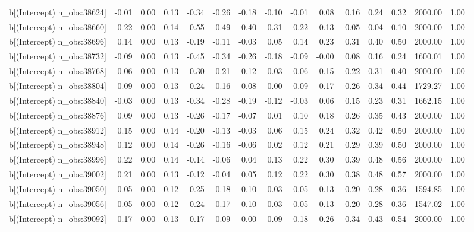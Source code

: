 \begin{table}[ht]
\begin{tabular}{rrrrrrrrrrrrrrr}
  b[(Intercept) n\_obs:38624] & -0.01 & 0.00 & 0.13 & -0.34 & -0.26 & -0.18 & -0.10 & -0.01 & 0.08 & 0.16 & 0.24 & 0.32 & 2000.00 & 1.00 \\ 
  b[(Intercept) n\_obs:38660] & -0.22 & 0.00 & 0.14 & -0.55 & -0.49 & -0.40 & -0.31 & -0.22 & -0.13 & -0.05 & 0.04 & 0.10 & 2000.00 & 1.00 \\ 
  b[(Intercept) n\_obs:38696] & 0.14 & 0.00 & 0.13 & -0.19 & -0.11 & -0.03 & 0.05 & 0.14 & 0.23 & 0.31 & 0.40 & 0.50 & 2000.00 & 1.00 \\ 
  b[(Intercept) n\_obs:38732] & -0.09 & 0.00 & 0.13 & -0.45 & -0.34 & -0.26 & -0.18 & -0.09 & -0.00 & 0.08 & 0.16 & 0.24 & 1600.01 & 1.00 \\ 
  b[(Intercept) n\_obs:38768] & 0.06 & 0.00 & 0.13 & -0.30 & -0.21 & -0.12 & -0.03 & 0.06 & 0.15 & 0.22 & 0.31 & 0.40 & 2000.00 & 1.00 \\ 
  b[(Intercept) n\_obs:38804] & 0.09 & 0.00 & 0.13 & -0.24 & -0.16 & -0.08 & -0.00 & 0.09 & 0.17 & 0.26 & 0.34 & 0.44 & 1729.27 & 1.00 \\ 
  b[(Intercept) n\_obs:38840] & -0.03 & 0.00 & 0.13 & -0.34 & -0.28 & -0.19 & -0.12 & -0.03 & 0.06 & 0.15 & 0.23 & 0.31 & 1662.15 & 1.00 \\ 
  b[(Intercept) n\_obs:38876] & 0.09 & 0.00 & 0.13 & -0.26 & -0.17 & -0.07 & 0.01 & 0.10 & 0.18 & 0.26 & 0.35 & 0.43 & 2000.00 & 1.00 \\ 
  b[(Intercept) n\_obs:38912] & 0.15 & 0.00 & 0.14 & -0.20 & -0.13 & -0.03 & 0.06 & 0.15 & 0.24 & 0.32 & 0.42 & 0.50 & 2000.00 & 1.00 \\ 
  b[(Intercept) n\_obs:38948] & 0.12 & 0.00 & 0.14 & -0.26 & -0.16 & -0.06 & 0.02 & 0.12 & 0.21 & 0.29 & 0.39 & 0.50 & 2000.00 & 1.00 \\ 
  b[(Intercept) n\_obs:38996] & 0.22 & 0.00 & 0.14 & -0.14 & -0.06 & 0.04 & 0.13 & 0.22 & 0.30 & 0.39 & 0.48 & 0.56 & 2000.00 & 1.00 \\ 
  b[(Intercept) n\_obs:39002] & 0.21 & 0.00 & 0.13 & -0.12 & -0.04 & 0.05 & 0.12 & 0.22 & 0.30 & 0.38 & 0.48 & 0.57 & 2000.00 & 1.00 \\ 
  b[(Intercept) n\_obs:39050] & 0.05 & 0.00 & 0.12 & -0.25 & -0.18 & -0.10 & -0.03 & 0.05 & 0.13 & 0.20 & 0.28 & 0.36 & 1594.85 & 1.00 \\ 
  b[(Intercept) n\_obs:39056] & 0.05 & 0.00 & 0.12 & -0.24 & -0.17 & -0.10 & -0.03 & 0.05 & 0.13 & 0.20 & 0.28 & 0.36 & 1547.02 & 1.00 \\ 
  b[(Intercept) n\_obs:39092] & 0.17 & 0.00 & 0.13 & -0.17 & -0.09 & 0.00 & 0.09 & 0.18 & 0.26 & 0.34 & 0.43 & 0.54 & 2000.00 & 1.00 \\ 

\end{tabular}
\end{table}
